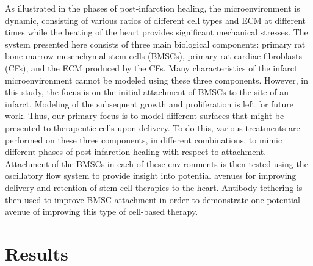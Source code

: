 As illustrated in the phases of post-infarction healing, the microenvironment is dynamic, consisting of various ratios of different cell types and ECM at different times while the beating of the heart provides significant mechanical stresses. The system presented here consists of three main biological components: primary rat bone-marrow mesenchymal stem-cells (BMSCs), primary rat cardiac fibroblasts (CFs), and the ECM produced by the CFs. Many characteristics of the infarct microenvironment cannot be modeled using these three components. However, in this study, the focus is on the initial attachment of BMSCs to the site of an infarct. Modeling of the subsequent growth and proliferation is left for future work. Thus, our primary focus is to model different surfaces that might be presented to therapeutic cells upon delivery. To do this, various treatments are performed on these three components, in different combinations, to mimic different phases of post-infarction healing with respect to attachment. Attachment of the BMSCs in each of these environments is then tested using the oscillatory flow system to provide insight into potential avenues for improving delivery and retention of stem-cell therapies to the heart. Antibody-tethering is then used to improve BMSC attachment in order to demonstrate one potential avenue of improving this type of cell-based therapy.

\section{Results}

